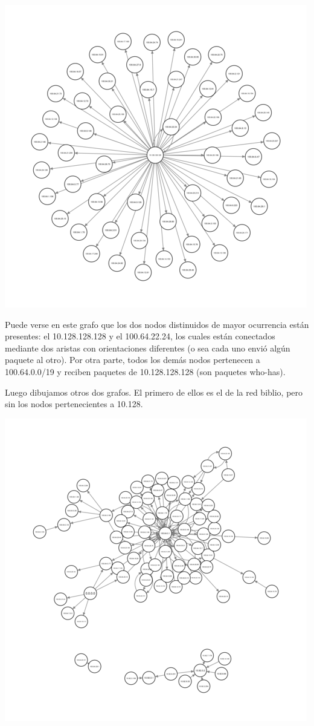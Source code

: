 \includegraphics[scale=0.6]{../img/biblio-grafo-redesAB.png}

Puede verse en este grafo que los dos nodos distinuidos de mayor
ocurrencia están presentes: el 10.128.128.128 y el 100.64.22.24, los
cuales están conectados mediante dos aristas con orientaciones
diferentes (o sea cada uno envió algún paquete al otro). Por otra
parte, todos los demás nodos pertenecen a 100.64.0.0/19 y reciben
paquetes de 10.128.128.128 (son paquetes who-has).

Luego dibujamos otros dos grafos. El primero de ellos es el de la red
biblio, pero sin los nodos pertenecientes a 10.128.

\includegraphics[scale=0.6]{../img/biblio-grafo-red-100-64.png}

